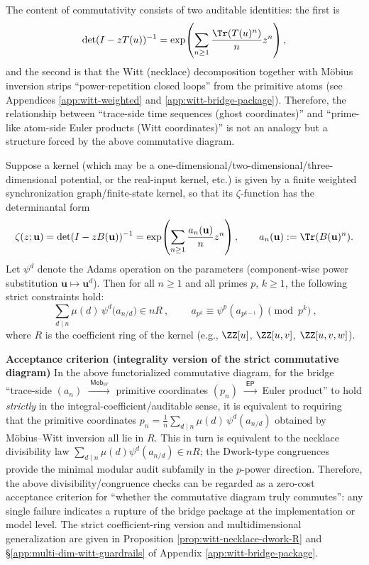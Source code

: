 The content of commutativity consists of two auditable identities: the first is
\[
\det(I-zT(u))^{-1}=\exp\!\left(\sum_{n\ge 1}\frac{\Tr(T(u)^n)}{n}z^n\right),
\]
and the second is that the Witt (necklace) decomposition together with M\"obius inversion strips ``power-repetition closed loops'' from the primitive atoms (see Appendices \ref{app:witt-weighted} and \ref{app:witt-bridge-package}).
Therefore, the relationship between ``trace-side time sequences (ghost coordinates)'' and ``prime-like atom-side Euler products (Witt coordinates)'' is not an analogy but a structure forced by the above commutative diagram.

\begin{remark}\label{cor:big-witt-audit-guardrails}
Suppose a kernel (which may be a one-dimensional/two-dimensional/three-dimensional potential, or the real-input kernel, etc.) is given by a finite weighted synchronization graph/finite-state kernel, so that its \(\zeta\)-function has the determinantal form
\[
\zeta(z;\mathbf u)=\det(I-zB(\mathbf u))^{-1}=\exp\!\left(\sum_{n\ge 1}\frac{a_n(\mathbf u)}{n}z^n\right),
\qquad a_n(\mathbf u):=\Tr(B(\mathbf u)^n).
\]
Let \(\psi^d\) denote the Adams operation on the parameters (component-wise power substitution \(\mathbf u\mapsto \mathbf u^d\)).
Then for all \(n\ge 1\) and all primes \(p\), \(k\ge 1\), the following strict constraints hold:
\[
\boxed{\ \sum_{d\mid n}\mu(d)\,\psi^d\!\bigl(a_{n/d}\bigr)\in nR\ },
\qquad
\boxed{\ a_{p^k}\equiv \psi^p(a_{p^{k-1}})\pmod{p^k}\ },
\]
where \(R\) is the coefficient ring of the kernel (e.g., \(\ZZ[u]\), \(\ZZ[u,v]\), \(\ZZ[u,v,w]\)).
\par
\medskip\noindent\textbf{Acceptance criterion (integrality version of the strict commutative diagram)}
In the above functorialized commutative diagram, for the bridge ``trace-side \((a_n)\) \(\xrightarrow{\ \mathsf{Mob}_W\ }\) primitive coordinates \((p_n)\) \(\xrightarrow{\ \mathsf{EP}\ }\) Euler product'' to hold \emph{strictly} in the integral-coefficient/auditable sense, it is equivalent to requiring that the primitive coordinates \(p_n=\frac1n\sum_{d\mid n}\mu(d)\,\psi^d(a_{n/d})\) obtained by M\"obius--Witt inversion all lie in \(R\).
This in turn is equivalent to the necklace divisibility law \(\sum_{d\mid n}\mu(d)\psi^d(a_{n/d})\in nR\); the Dwork-type congruences provide the minimal modular audit subfamily in the \(p\)-power direction.
Therefore, the above divisibility/congruence checks can be regarded as a zero-cost acceptance criterion for ``whether the commutative diagram truly commutes'': any single failure indicates a rupture of the bridge package at the implementation or model level.
The strict coefficient-ring version and multidimensional generalization are given in Proposition \ref{prop:witt-necklace-dwork-R} and \S\ref{app:multi-dim-witt-guardrails} of Appendix \ref{app:witt-bridge-package}.
\end{remark}

